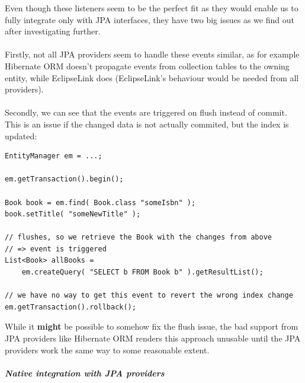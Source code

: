 \noindent
Even though these listeners seem to be the perfect fit as they would enable us to fully integrate only with JPA interfaces, they have two big issues as we find out after investigating further.
\\\\
Firstly, not all JPA providers seem to handle these events similar, as for example Hibernate ORM doesn't propagate events from collection tables to the owning entity, while EclipseLink does (EclipseLink's behaviour would be needed from all providers).
\\\\
Secondly, we can see that the events are triggered on flush instead of commit. This is an issue if the changed data is not actually commited, but the index is updated:
\\

\lstset{language=java}
\begin{lstlisting}[frame=htrbl, caption={Event triggering on flush}, label={lst:flush_event.java}]
EntityManager em = ...;

em.getTransaction().begin();

Book book = em.find( Book.class "someIsbn" );
book.setTitle( "someNewTitle" );

// flushes, so we retrieve the Book with the changes from above
// => event is triggered
List<Book> allBooks = 
	em.createQuery( "SELECT b FROM Book b" ).getResultList();

// we have no way to get this event to revert the wrong index change
em.getTransaction().rollback();
\end{lstlisting}

\noindent
While it \textbf{might} be possible to somehow fix the flush issue, the bad support from JPA providers like Hibernate ORM renders this approach unusable until the JPA providers work the same way to some reasonable extent.

\subparagraph{Native integration with JPA providers}

